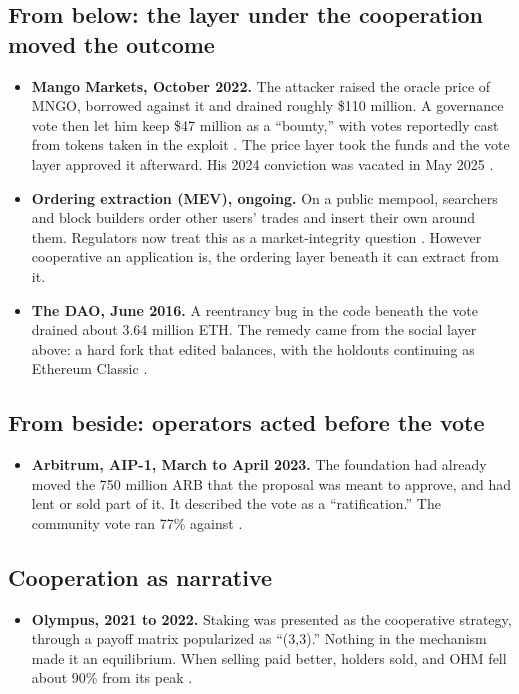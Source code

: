\documentclass[11pt]{article}
\begin{document}
\subsection{From below: the layer under the cooperation moved the outcome}

\begin{itemize}
\item \textbf{Mango Markets, October 2022.} The attacker raised the oracle price of MNGO, borrowed against it and drained roughly \$110 million. A governance vote then let him keep \$47 million as a ``bounty,'' with votes reportedly cast from tokens taken in the exploit \cite{mango}. The price layer took the funds and the vote layer approved it afterward. His 2024 conviction was vacated in May 2025 \cite{mangocourt}.
\item \textbf{Ordering extraction (MEV), ongoing.} On a public mempool, searchers and block builders order other users' trades and insert their own around them. Regulators now treat this as a market-integrity question \cite{esma}. However cooperative an application is, the ordering layer beneath it can extract from it.
\item \textbf{The DAO, June 2016.} A reentrancy bug in the code beneath the vote drained about 3.64 million ETH. The remedy came from the social layer above: a hard fork that edited balances, with the holdouts continuing as Ethereum Classic \cite{thedao}.
\end{itemize}

\subsection{From beside: operators acted before the vote}

\begin{itemize}
\item \textbf{Arbitrum, AIP-1, March to April 2023.} The foundation had already moved the 750 million ARB that the proposal was meant to approve, and had lent or sold part of it. It described the vote as a ``ratification.'' The community vote ran 77\% against \cite{arbitrum}.
\end{itemize}

\subsection{Cooperation as narrative}

\begin{itemize}
\item \textbf{Olympus, 2021 to 2022.} Staking was presented as the cooperative strategy, through a payoff matrix popularized as ``(3,3).'' Nothing in the mechanism made it an equilibrium. When selling paid better, holders sold, and OHM fell about 90\% from its peak \cite{olympus}.
\end{itemize}
\end{document}

